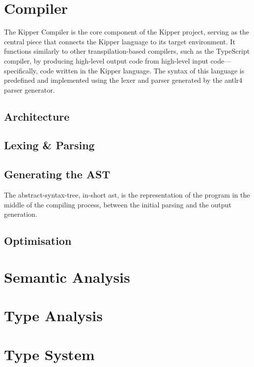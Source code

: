 \section{Compiler}
\label{sec:compiler}

The Kipper Compiler is the core component of the Kipper project, serving as the central piece that connects the Kipper language to its target environment. It functions similarly to other \gls{transpilation}-based compilers, such as the TypeScript compiler, by producing high-level output code from high-level input code—specifically, code written in the Kipper language. The syntax of this language is predefined and implemented using the lexer and parser generated by the \Gls{antlr4} parser generator.

\subsection{Architecture}

\subsection{Lexing \& Parsing}

\subsection{Generating the AST}

The \gls{abstract-syntax-tree}, in-short \acrshort{ast}, is the representation of the program in the middle of the compiling process, between the initial parsing and the output generation.

\subsection{Optimisation}

\section{Semantic Analysis}
\label{sec:semantic-analysis}

\section{Type Analysis}
\label{sec:type-analysis}

\section{Type System}

